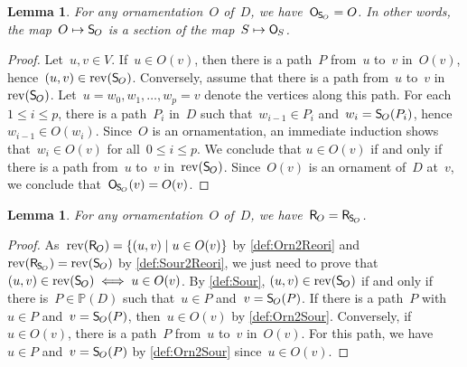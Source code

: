 \documentclass{amsart}
\newtheorem{lemma}[theorem]{Lemma}
\theoremstyle{definition}
\newcommand{\set}[2]{\left\{ #1 \;\middle|\; #2 \right\}} %
\newcommand{\mymap}[2]{\mathsf{#1}_{\hspace{-.7pt}#2}}
\newcommand{\orn}[1]{\mymap{O}{#1}}  %
\newcommand{\reori}[1]{\mymap{R}{#1}}  %
\DeclareMathOperator{\rev}{rev} %
\newcommand{\sour}[1]{\mymap{S}{#1}}  %
\newcommand{\PP}{\mathbb P} %
\begin{document}
\begin{lemma}
\label{lem:Orn2Sour2}
For any ornamentation~$O$ of~$D$, we have~$\orn{\sour{O}} = O$. In other words, the map~${O \mapsto \sour{O}}$ is a section of the map~$S \mapsto \orn{S}$.
\end{lemma}

\begin{proof}
Let~$u,v \in V$.
If~$u \in O(v)$, then there is a path~$P$ from~$u$ to~$v$ in~$O(v)$, hence~$(u,v) \in \rev(\sour{O})$.
Conversely, assume that there is a path from~$u$ to~$v$ in~$\rev(\sour{O})$.
Let~$u = w_0, w_1, \dots, w_p = v$ denote the vertices along this path.
For each $1 \le i \le p$, there is a path~$P_i$ in~$D$ such that~$w_{i-1} \in P_i$ and~$w_i = \sour{O}(P_i)$, hence~$w_{i-1} \in O(w_i)$.
Since~$O$ is an ornamentation, an immediate induction shows that~$w_i \in O(v)$ for all~$0 \le i \le p$.
We conclude that $u \in O(v)$ if and only if there is a path from~$u$ to~$v$ in~$\rev(\sour{O})$.
Since~$O(v)$ is an ornament of~$D$ at~$v$, we conclude that~$\orn{\sour{O}}(v) = O(v)$.
\end{proof}

\begin{lemma}
\label{lem:Orn2Sour3}
For any ornamentation~$O$ of~$D$, we have~$\reori{O} = \reori{\sour{O}}$.
\end{lemma}

\begin{proof}
As~$\rev(\reori{O}) = \set{(u,v)}{u \in O(v)}$ by \cref{def:Orn2Reori} and~$\rev(\reori{\sour{O}}) = \rev(\sour{O})$ by \cref{def:Sour2Reori}, we just need to prove that~$(u,v) \in \rev(\sour{O}) \iff u \in O(v)$.
By \cref{def:Sour}, $(u,v) \in \rev(\sour{O})$ if and only if there is~$P \in \PP(D)$ such that~$u \in P$ and~$v = \sour{O}(P)$.
If there is a path~$P$ with~$u \in P$ and~$v = \sour{O}(P)$, then~$u \in O(v)$ by \cref{def:Orn2Sour}.
Conversely, if~$u \in O(v)$, there is a path~$P$ from~$u$ to~$v$ in~$O(v)$.
For this path, we have~$u \in P$ and~$v = \sour{O}(P)$ by \cref{def:Orn2Sour} since~$u \in O(v)$.
\end{proof}
\end{document}
